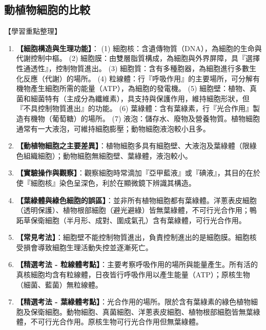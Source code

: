 \documentclass[11pt,a4paper]{article}
\begin{document}
\subsection{動植物細胞的比較}
\begin{learningpoints}{【學習重點整理】}
\begin{enumerate}[label=\arabic*.]
  \item \textbf{【細胞構造與生理功能】}：
  (1) 細胞核：含遺傳物質（DNA），為細胞的生命與代謝控制中樞。
  (2) 細胞膜：由雙層脂質構成，為細胞與外界屏障，具『選擇性通透性』，控制物質進出。
  (3) 細胞質：含有多種胞器，為細胞進行多數生化反應（代謝）的場所。
  (4) 粒線體：行『呼吸作用』的主要場所，可分解有機物產生細胞所需的能量（ATP），為細胞的發電機。
  (5) 細胞壁：植物、真菌和細菌特有（主成分為纖維素），具支持與保護作用，維持細胞形狀，但『不具控制物質進出』的功能。
  (6) 葉綠體：含有葉綠素，行『光合作用』製造有機物（葡萄糖）的場所。
  (7) 液泡：儲存水、廢物及營養物質。植物細胞通常有一大液泡，可維持細胞膨壓；動物細胞液泡較小且多。
  \item \textbf{【動植物細胞之主要差異】}：植物細胞多具有細胞壁、大液泡及葉綠體（限綠色組織細胞）；動物細胞無細胞壁、葉綠體，液泡較小。
  \item \textbf{【實驗操作與觀察】}：觀察細胞時常滴加『亞甲藍液』或『碘液』，其目的在於使『細胞核』染色呈深色，利於在顯微鏡下辨識其構造。
  \item \textbf{【葉綠體與綠色細胞的誤區】}：並非所有植物細胞都有葉綠體。洋蔥表皮細胞（透明保護）、植物根部細胞（避光避綠）皆無葉綠體，不可行光合作用；鴨跖草保衛細胞（半月形、成對、圍成氣孔）含有葉綠體，可行光合作用。
  \item \textbf{【常見考法】}：細胞壁不能控制物質進出，負責控制進出的是細胞膜。細胞核受損會導致細胞生理活動失控並逐漸死亡。
  \item \textbf{【精選考法 - 粒線體考點】}：主要考察呼吸作用的場所與能量產生。所有活的真核細胞均含有粒線體，日夜皆行呼吸作用以產生能量（ATP）；原核生物（細菌、藍菌）無粒線體。
  \item \textbf{【精選考法 - 葉綠體考點】}：光合作用的場所。限於含有葉綠素的綠色植物細胞及保衛細胞。動物細胞、真菌細胞、洋蔥表皮細胞、植物根部細胞皆無葉綠體，不可行光合作用。原核生物可行光合作用但無葉綠體。
\end{enumerate}
\end{learningpoints}
\end{document}
